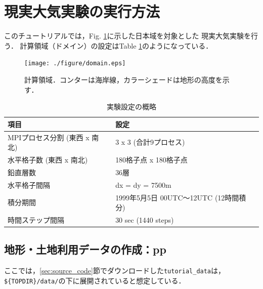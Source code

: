 \section{現実大気実験の実行方法}

このチュートリアルでは，Fig. \ref{fig:domain}に示した日本域を対象とした
現実大気実験を行う．
計算領域（ドメイン）の設定はTable \ref{tab:grids}のようになっている．

\begin{figure}[h]
\begin{center}
  \texttt{[image: ./figure/domain.eps]}\\
  \caption{計算領域．コンターは海岸線，カラーシェードは地形の高度を示す．}
  \label{fig:domain}
\end{center}
\end{figure}

\begin{table}[h]
\begin{center}
  \caption{実験設定の概略}
  \label{tab:grids}
  \begin{tabularx}{150mm}{|l|X|} \hline
    \rowcolor[gray]{0.9} 項目 & 設定 \\ \hline
    MPIプロセス分割 (東西 x 南北) & 3 x 3 (合計9プロセス) \\ \hline
    水平格子数 (東西 x 南北) & 180格子点 x 180格子点 \\ \hline
    鉛直層数                 & 36層                  \\ \hline
    水平格子間隔             & dx = dy = 7500m       \\ \hline
    積分期間 & 1999年5月5日 00UTC～12UTC (12時間積分) \\ \hline
    時間ステップ間隔 & 30 sec (1440 steps) \\ \hline
  \end{tabularx}
\end{center}
\end{table}



\subsection{地形・土地利用データの作成：pp}

ここでは，\ref{sec:source_code}節でダウンロードした\verb|tutorial_data|は，
\verb|${TOPDIR}/data/|の下に展開されていると想定している．

